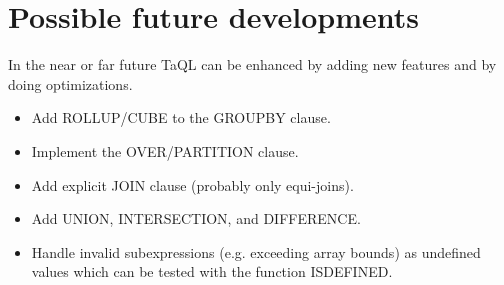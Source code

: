 \section{Possible future developments}
In the near or far future TaQL can be enhanced by adding new
features and by doing optimizations.
\begin{itemize}
  \item Add ROLLUP/CUBE to the GROUPBY clause.
  \item Implement the OVER/PARTITION clause.
  \item Add explicit JOIN clause (probably only equi-joins).
  \item Add UNION, INTERSECTION, and DIFFERENCE.
  \item Handle invalid subexpressions (e.g. exceeding array bounds)
    as undefined values
    which can be tested with the function ISDEFINED.
\end{itemize}

